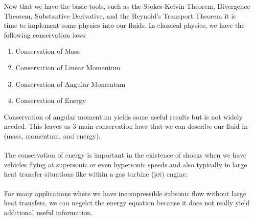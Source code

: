 Now that we have the basic tools, such as the Stokes-Kelvin Theorem, Divergence Theorem, Substantive Derivative, and the Reynold's Transport Theorem it is time to implement some physics into our fluids.
In classical physics, we have the following conservation laws:
\begin{enumerate}
\item Conservation of Mass
\item Conservation of Linear Momentum
\item Conservation of Angular Momentum
\item Conservation of Energy
\end{enumerate}
Conservation of angular momentum yields some useful results but is not widely needed.
This leaves us $3$ main conservation laws that we can describe our fluid in (mass, momentum, and energy).
\\~\\The conservation of energy is important in the existence of shocks when we have vehicles flying at supersonic or even hypersonic speeds and also typically in large heat transfer situations like within a gas turbine (jet) engine.
\\~\\For many applications where we have incompressible subsonic flow without large heat transfers, we can negelct the energy equation because it does not really yield additional useful information.

